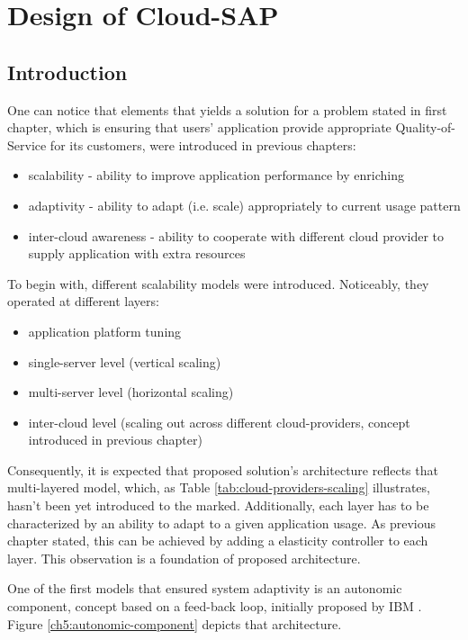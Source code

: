 \chapter{Design of Cloud-SAP}


\section{Introduction}

One can notice that elements that yields a solution for a problem stated in first chapter, which is ensuring that users' application provide appropriate Quality-of-Service for its customers, were introduced in previous chapters:
\begin{itemize}
	\item scalability - ability to improve application performance by enriching 
	\item adaptivity - ability to adapt (i.e. scale) appropriately to current usage pattern
	\item inter-cloud awareness - ability to cooperate with different cloud provider to supply application with extra resources
\end{itemize}

To begin with, different scalability models were introduced. Noticeably, they operated at different layers: 
\begin{itemize}
	\item application platform tuning
	\item single-server level (vertical scaling)
	\item multi-server level (horizontal scaling) 
	\item inter-cloud level (scaling out across different cloud-providers, concept introduced in previous chapter)
\end{itemize}
Consequently, it is expected that proposed solution's architecture reflects that multi-layered model, which, as Table \ref{tab:cloud-providers-scaling} illustrates, hasn't been yet introduced to the marked. Additionally, each layer has to be characterized by an ability to adapt to a given application usage. As previous chapter stated, this can be achieved by adding a elasticity controller to each layer. This observation is a foundation of proposed architecture.

One of the first models that ensured system adaptivity is an autonomic component, concept based on a feed-back loop, initially proposed by IBM \cite{IBM06}. Figure \ref{ch5:autonomic-component} depicts that architecture. 

